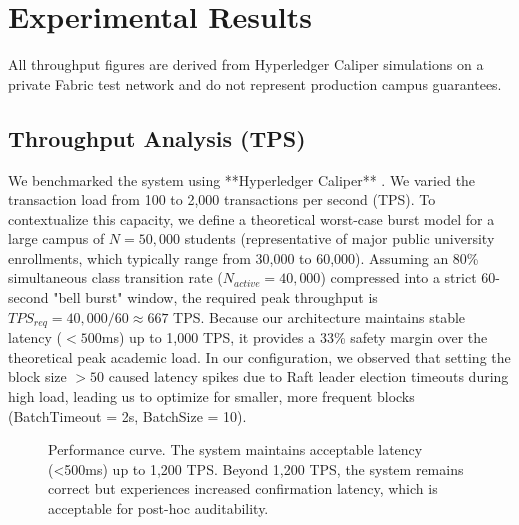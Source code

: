\documentclass[conference]{IEEEtran}
\begin{document}
\section{Experimental Results}
All throughput figures are derived from Hyperledger Caliper simulations on a private Fabric test network and do not represent production campus guarantees.
\subsection{Throughput Analysis (TPS)}
We benchmarked the system using **Hyperledger Caliper** \cite{b22}. We varied the transaction load from 100 to 2,000 transactions per second (TPS). To contextualize this capacity, we define a theoretical worst-case burst model for a large campus of $N=50,000$ students (representative of major public university enrollments, which typically range from 30,000 to 60,000). Assuming an 80\% simultaneous class transition rate ($N_{active} = 40,000$) compressed into a strict 60-second "bell burst" window, the required peak throughput is $TPS_{req} = 40,000 / 60 \approx 667$ TPS. Because our architecture maintains stable latency ($<500$ms) up to 1,000 TPS, it provides a 33\% safety margin over the theoretical peak academic load. In our configuration, we observed that setting the block size $>50$ caused latency spikes due to Raft leader election timeouts during high load, leading us to optimize for smaller, more frequent blocks (BatchTimeout = 2s, BatchSize = 10).

\begin{figure}[htbp]
\centering
{}
\caption{Performance curve. The system maintains acceptable latency (<500ms) up to 1,200 TPS. Beyond 1,200 TPS, the system remains correct but experiences increased confirmation latency, which is acceptable for post-hoc auditability.}
\label{fig:throughput}
\end{figure}
\end{document}
